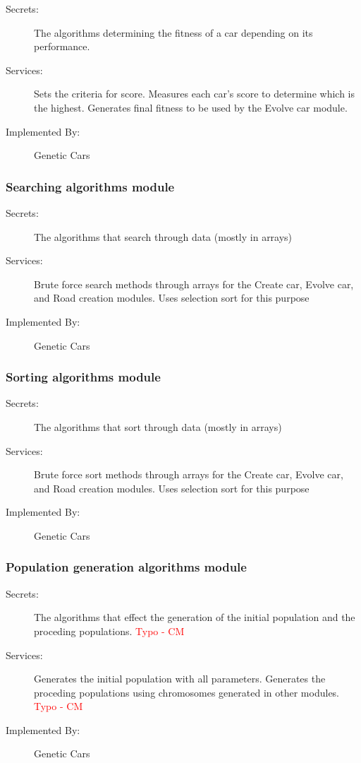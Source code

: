 \documentclass[12pt, titlepage]{article}
\begin{document}
\begin{description}
\item[Secrets:] The algorithms determining the fitness of  a car depending on 
its performance.
\item[Services:] Sets the criteria for score. Measures each car's score to 
determine which is the highest. Generates final fitness to be used by the Evolve 
car module.
\item[Implemented By:] Genetic Cars
\end{description}

\subsubsection{Searching algorithms module}

\begin{description}
\item[Secrets:] The algorithms that search through data (mostly in arrays)
\item[Services:] Brute force search methods through arrays for the Create car, 
Evolve car, and Road creation modules. Uses selection sort for this purpose
\item[Implemented By:] Genetic Cars
\end{description}

\subsubsection{Sorting algorithms module}

\begin{description}
\item[Secrets:] The algorithms that sort through data (mostly in arrays)
\item[Services:] Brute force sort methods through arrays for the Create car, 
Evolve car, and Road creation modules. Uses selection sort for this purpose
\item[Implemented By:] Genetic Cars
\end{description}

\subsubsection{Population generation algorithms module}

\begin{description}
\item[Secrets:] The algorithms that effect the generation of the initial 
population and the proceding populations. \textcolor{red}{Typo - CM} 
\item[Services:] Generates the initial population with all parameters. Generates 
the proceding populations using chromosomes generated in other modules. \textcolor{red}{Typo - CM} 
\item[Implemented By:] Genetic Cars
\end{description}
\end{document}
